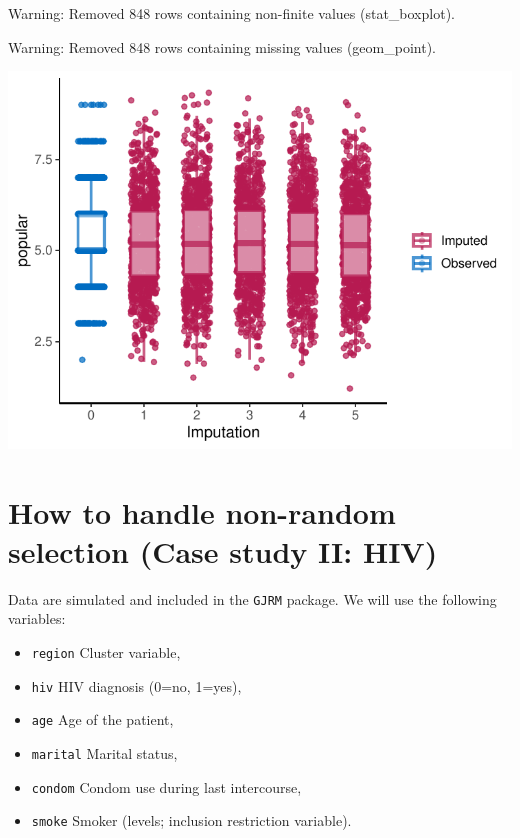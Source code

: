 \documentclass[
]{jss}
\providecommand{\tightlist}{%
  \setlength{\itemsep}{0pt}\setlength{\parskip}{0pt}}
\begin{document}
\begin{CodeChunk}
\begin{CodeOutput}
Warning: Removed 848 rows containing non-finite values (stat_boxplot).
\end{CodeOutput}
\begin{CodeOutput}
Warning: Removed 848 rows containing missing values (geom_point).
\end{CodeOutput}


\begin{center}\includegraphics{Imputation_of_Incomplete_Multilevel_Data_files/figure-latex/pop_pan_eval-1} \end{center}

\end{CodeChunk}

\hypertarget{how-to-handle-non-random-selection-case-study-ii-hiv}{%
\section{How to handle non-random selection (Case study II:
HIV)}\label{how-to-handle-non-random-selection-case-study-ii-hiv}}

Data are simulated and included in the \texttt{GJRM} package. We will
use the following variables:

\begin{itemize}
\tightlist
\item
  \texttt{region} Cluster variable,
\item
  \texttt{hiv} HIV diagnosis (0=no, 1=yes),
\item
  \texttt{age} Age of the patient,
\item
  \texttt{marital} Marital status,
\item
  \texttt{condom} Condom use during last intercourse,
\item
  \texttt{smoke} Smoker (levels; inclusion restriction variable).
\end{itemize}
\end{document}
